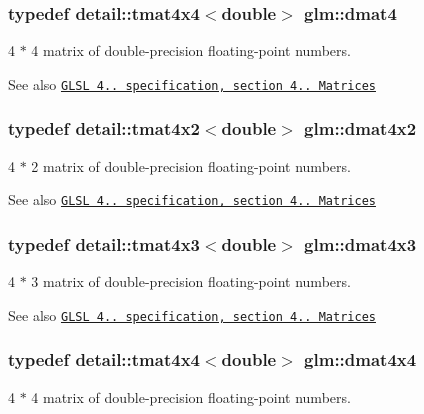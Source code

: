 \subsubsection[{dmat4}]{\setlength{\rightskip}{0pt plus 5cm}typedef detail\+::tmat4x4$<$double$>$ {\bf glm\+::dmat4}}\label{group__core__types_ga68b5efb5d529f9031481ef36f9babd96}
4 $\ast$ 4 matrix of double-\/precision floating-\/point numbers.

\begin{DoxySeeAlso}{See also}
\href{http://www.opengl.org/registry/doc/GLSLangSpec.4.20.8.pdf}{\tt G\+L\+S\+L 4.. specification, section 4.. Matrices} 
\end{DoxySeeAlso}
\hypertarget{group__core__types_gaec598e6dda8b2119877d992f5e0c1bae}{}
\subsubsection[{dmat4x2}]{\setlength{\rightskip}{0pt plus 5cm}typedef detail\+::tmat4x2$<$double$>$ {\bf glm\+::dmat4x2}}\label{group__core__types_gaec598e6dda8b2119877d992f5e0c1bae}
4 $\ast$ 2 matrix of double-\/precision floating-\/point numbers.

\begin{DoxySeeAlso}{See also}
\href{http://www.opengl.org/registry/doc/GLSLangSpec.4.20.8.pdf}{\tt G\+L\+S\+L 4.. specification, section 4.. Matrices} 
\end{DoxySeeAlso}
\hypertarget{group__core__types_ga47f7b642f84d1272a0dafa221c8fd720}{}
\subsubsection[{dmat4x3}]{\setlength{\rightskip}{0pt plus 5cm}typedef detail\+::tmat4x3$<$double$>$ {\bf glm\+::dmat4x3}}\label{group__core__types_ga47f7b642f84d1272a0dafa221c8fd720}
4 $\ast$ 3 matrix of double-\/precision floating-\/point numbers.

\begin{DoxySeeAlso}{See also}
\href{http://www.opengl.org/registry/doc/GLSLangSpec.4.20.8.pdf}{\tt G\+L\+S\+L 4.. specification, section 4.. Matrices} 
\end{DoxySeeAlso}
\hypertarget{group__core__types_gaa505ead5e0b6d8bc504ccfeadbac83d5}{}
\subsubsection[{dmat4x4}]{\setlength{\rightskip}{0pt plus 5cm}typedef detail\+::tmat4x4$<$double$>$ {\bf glm\+::dmat4x4}}\label{group__core__types_gaa505ead5e0b6d8bc504ccfeadbac83d5}
4 $\ast$ 4 matrix of double-\/precision floating-\/point numbers.

